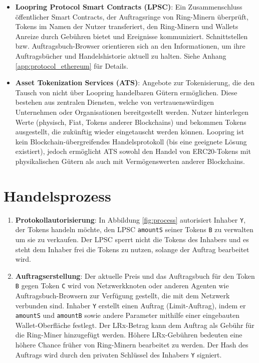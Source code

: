 \documentclass[UTF8,nofonts]{article}
\begin{document}
\begin{multicols}{2}
\begin{itemize}
\item \textbf{Loopring Protocol Smart Contracts (LPSC)}: Ein Zusammenschluss öffentlicher Smart Contracts, der Auftragsringe von Ring-Minern überprüft, Tokens im Namen der Nutzer transferiert, den Ring-Minern und Wallets Anreize durch Gebühren bietet und Ereignisse kommuniziert. Schnittstellen bzw. Auftragsbuch-Browser orientieren sich an den Informationen, um ihre Auftragsbücher und Handelshistorie aktuell zu halten. Siehe Anhang \ref{app:protocol_ethereum} für Details.

\item \textbf{Asset Tokenization Services (ATS)}: Angebote zur Tokenisierung, die den Tausch von nicht über Loopring handelbaren Gütern ermöglichen. Diese bestehen aus zentralen Diensten, welche von vertrauenswürdigen Unternehmen oder Organisationen bereitgestellt werden. Nutzer hinterlegen Werte (physisch, Fiat, Tokens anderer Blockchains) und bekommen Tokens ausgestellt, die zukünftig wieder eingetauscht werden können. Loopring ist kein Blockchain-übergreifendes Handelsprotokoll (bis eine geeignete Lösung existiert), jedoch ermöglicht ATS sowohl den Handel von ERC20-Tokens \cite{ERC20} mit physikalischen Gütern als auch mit Vermögenswerten anderer Blockchains.

\end{itemize}


\section{Handelsprozess\label{sec:process}}



\begin{enumerate} 


\item \textbf{Protokollautorisierung}: In Abbildung \ref{fig:process} autorisiert Inhaber \verb|Y|, der Tokens handeln möchte, den LPSC \verb|amountS| seiner Tokens \verb|B| zu verwalten um sie zu verkaufen. Der LPSC sperrt nicht die Tokens des Inhabers und es steht dem Inhaber frei die Tokens zu nutzen, solange der Auftrag bearbeitet wird.

\item \textbf{Auftragserstellung}: Der aktuelle Preis und das Auftragsbuch für den Token \verb|B| gegen Token \verb|C| wird von Netzwerkknoten oder anderen Agenten wie Auftragsbuch-Browsern zur Verfügung gestellt, die mit dem Netzwerk verbunden sind. Inhaber \verb|Y| erstellt einen Auftrag (Limit-Auftrag), indem er \verb|amountS| und \verb|amountB| sowie andere Parameter mithilfe einer eingebauten Wallet-Oberfläche festlegt. Der LRx-Betrag kann dem Auftrag als Gebühr für die Ring-Miner hinzugefügt werden. Höhere LRx-Gebühren bedeuten eine höhere Chance früher von Ring-Minern bearbeitet zu werden. Der Hash des Auftrags wird durch den privaten Schlüssel des Inhabers \verb|Y| signiert.


\end{enumerate}
\end{multicols}
\end{document}
